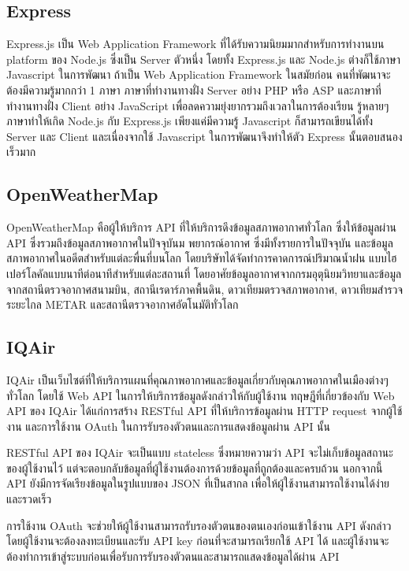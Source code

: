 \subsection{Express}
Express.js เป็น Web Application Framework ที่ได้รับความนิยมมากสำหรับการทำงานบน platform ของ Node.js
ซึ่งเป็น Server ตัวหนึ่ง โดยทั้ง Express.js และ Node.js ต่างก็ใช้ภาษา Javascript ในการพัฒนา ถ้าเป็น Web
Application Framework ในสมัยก่อน คนที่พัฒนาจะต้องมีความรู้มากกว่า 1 ภาษา ภาษาที่ทำงานทางฝั่ง Server อย่าง PHP
หรือ ASP และภาษาที่ทำงานทางฝั่ง Client อย่าง JavaScript เพื่อลดความยุ่งยากรวมถึงเวลาในการต้องเรียน รู้หลายๆ ภาษาทำให้เกิด
Node.js กับ Express.js เพียงแค่มีความรู้ Javascript ก็สามารถเขียนได้ทั้ง Server และ Client และเนื่องจากใช้
Javascript ในการพัฒนาจึงทำให้ตัว Express นั้นตอบสนองเร็วมาก~\cite{express-doc}

\subsection{OpenWeatherMap}
OpenWeatherMap คือผู้ให้บริการ API ที่ให้บริการดึงข้อมูลสภาพอากาศทั่วโลก ซึ่งให้ข้อมูลผ่าน API ซึ่งรวมถึงข้อมูลสภาพอากาศในปัจจุบันม
พยากรณ์อากาศ ซึ่งมีทั้งรายการในปัจจุบัน และข้อมูลสภาพอากาศในอดีตสำหรับแต่ละพื่นที่บนโลก โดยบริษัทได้จัดทำการคาดการณ์ปริมาณน้ำฝน
แบบไฮเปอร์โลคัลแบบนาทีต่อนาทีสำหรับแต่ละสถานที่ โดยอาศัยข้อมูลอากาศจากกรมอุตุนิยมวิทยาและข้อมูลจากสถานีตรวจอากาศสนามบิน,
สถานีเรดาร์ภาคพื้นดิน, ดาวเทียมตรวจสภาพอากาศ, ดาวเทียมสำรวจระยะไกล METAR และสถานีตรวจอากาศอัตโนมัติทั่วโลก~\cite{openweather-doc}

\subsection{IQAir}
IQAir เป็นเว็บไซต์ที่ให้บริการแผนที่คุณภาพอากาศและข้อมูลเกี่ยวกับคุณภาพอากาศในเมืองต่างๆ ทั่วโลก โดยใช้ Web API ในการให้บริการข้อมูลดังกล่าวให้กับผู้ใช้งาน
ทฤษฎีที่เกี่ยวข้องกับ Web API ของ IQAir ได้แก่การสร้าง RESTful API ที่ให้บริการข้อมูลผ่าน HTTP request จากผู้ใช้งาน และการใช้งาน OAuth
ในการรับรองตัวตนและการแสดงข้อมูลผ่าน API นั้น

RESTful API ของ IQAir จะเป็นแบบ stateless ซึ่งหมายความว่า API จะไม่เก็บข้อมูลสถานะของผู้ใช้งานไว้ แต่จะตอบกลับข้อมูลที่ผู้ใช้งานต้องการด้วยข้อมูลที่ถูกต้องและครบถ้วน
นอกจากนี้ API ยังมีการจัดเรียงข้อมูลในรูปแบบของ JSON ที่เป็นสากล เพื่อให้ผู้ใช้งานสามารถใช้งานได้ง่ายและรวดเร็ว

การใช้งาน OAuth จะช่วยให้ผู้ใช้งานสามารถรับรองตัวตนของตนเองก่อนเข้าใช้งาน API ดังกล่าว โดยผู้ใช้งานจะต้องลงทะเบียนและรับ API key ก่อนที่จะสามารถเรียกใช้ API ได้
และผู้ใช้งานจะต้องทำการเข้าสู่ระบบก่อนเพื่อรับการรับรองตัวตนและสามารถแสดงข้อมูลได้ผ่าน API

